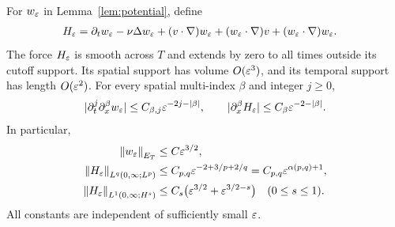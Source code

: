 \begin{lemma}\label{lem:correction}
For $w_\varepsilon$ in Lemma~\ref{lem:potential}, define
\begin{align}
 H_\varepsilon={}&\partial_tw_\varepsilon-\nu\Delta w_\varepsilon
 +(v\cdot\nabla)w_\varepsilon+(w_\varepsilon\cdot\nabla)v
 +(w_\varepsilon\cdot\nabla)w_\varepsilon.\label{eq:H}
\end{align}
The force $H_\varepsilon$ is smooth across $T$ and extends by zero to all times outside its cutoff support. Its spatial support has volume $O(\varepsilon^3)$, and its temporal support has length $O(\varepsilon^2)$. For every spatial multi-index $\beta$ and integer $j\ge0$,
\begin{equation}\label{eq:derivativebounds}
 |\partial_t^j\partial_x^\beta w_\varepsilon|
 \le C_{\beta,j}\varepsilon^{-2j-|\beta|},\qquad
 |\partial_x^\beta H_\varepsilon|
 \le C_\beta\varepsilon^{-2-|\beta|}.
\end{equation}
In particular,
\begin{align}
 \left\lVert w_\varepsilon\right\rVert_{E_T}&\le C\varepsilon^{3/2},\label{eq:wE}\\
 \left\lVert H_\varepsilon\right\rVert_{L^q(0,\infty;L^p)}
   &\le C_{p,q}\varepsilon^{-2+3/p+2/q}
     =C_{p,q}\varepsilon^{\alpha(p,q)+1},\label{eq:Hmixed}\\
 \left\lVert H_\varepsilon\right\rVert_{L^1(0,\infty;H^s)}
   &\le C_s\bigl(\varepsilon^{3/2}+\varepsilon^{3/2-s}\bigr)
       \quad(0\le s\le1).\label{eq:HHs}
\end{align}
All constants are independent of sufficiently small $\varepsilon$.
\end{lemma}
